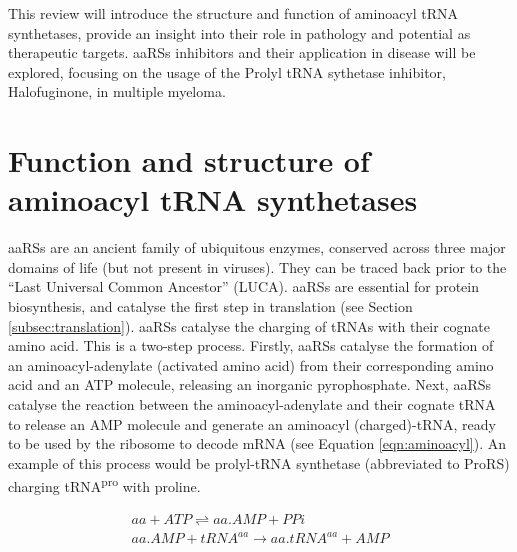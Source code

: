 This review will introduce the structure and function of aminoacyl tRNA synthetases, provide an insight into their role in pathology and potential as therapeutic targets.
aaRSs inhibitors and their application in disease will be explored, focusing on the usage of the Prolyl tRNA sythetase inhibitor, Halofuginone, in multiple myeloma.

\section{Function and structure of aminoacyl tRNA synthetases}

aaRSs are an ancient family of ubiquitous enzymes, conserved across three major domains of life (but not present in viruses).
They can be traced back prior to the ``Last Universal Common Ancestor'' (LUCA)\cite{de2020evolution}.
aaRSs are essential for protein biosynthesis, and catalyse the first step in translation (see Section \ref{subsec:translation}).
aaRSs catalyse the charging of tRNAs with their cognate amino acid.
This is a two-step process.
Firstly, aaRSs catalyse the formation of an aminoacyl-adenylate (activated amino acid) from their corresponding amino acid and an ATP molecule, releasing an inorganic pyrophosphate.
Next, aaRSs catalyse the reaction between the aminoacyl-adenylate and their cognate tRNA to release an AMP molecule and generate an aminoacyl (charged)-tRNA, ready to be used by the ribosome to decode mRNA (see Equation \ref{eqn:aminoacyl}).
An example of this process would be prolyl-tRNA synthetase (abbreviated to ProRS) charging tRNA\textsuperscript{pro} with proline.

\begin{equation}\label{eqn:aminoacyl}
\begin{gathered}
aa + ATP \rightleftharpoons  aa.AMP + PPi \\
aa.AMP + tRNA^{aa} \longrightarrow  aa.tRNA^{aa} + AMP
\end{gathered}
\end{equation}

